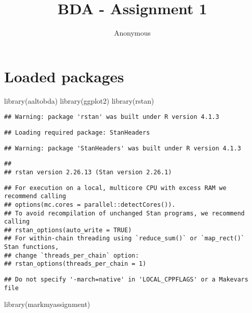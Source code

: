 \documentclass[
]{article}
\title{BDA - Assignment 1}
\author{Anonymous}
\date{}
\newenvironment{Shaded}{\begin{snugshade}}{\end{snugshade}}
\newcommand{\FunctionTok}[1]{\textcolor[rgb]{0.00,0.00,0.00}{#1}}
\newcommand{\NormalTok}[1]{#1}
\begin{document}
\maketitle

{
\hypersetup{linkcolor=}
\setcounter{tocdepth}{1}
\tableofcontents
}
\hypertarget{loaded-packages}{%
\section{Loaded packages}\label{loaded-packages}}

\begin{Shaded}
\begin{Highlighting}[]
\FunctionTok{library}\NormalTok{(aaltobda)}
\FunctionTok{library}\NormalTok{(ggplot2)}
\FunctionTok{library}\NormalTok{(rstan)}
\end{Highlighting}
\end{Shaded}

\begin{verbatim}
## Warning: package 'rstan' was built under R version 4.1.3
\end{verbatim}

\begin{verbatim}
## Loading required package: StanHeaders
\end{verbatim}

\begin{verbatim}
## Warning: package 'StanHeaders' was built under R version 4.1.3
\end{verbatim}

\begin{verbatim}
## 
## rstan version 2.26.13 (Stan version 2.26.1)
\end{verbatim}

\begin{verbatim}
## For execution on a local, multicore CPU with excess RAM we recommend calling
## options(mc.cores = parallel::detectCores()).
## To avoid recompilation of unchanged Stan programs, we recommend calling
## rstan_options(auto_write = TRUE)
## For within-chain threading using `reduce_sum()` or `map_rect()` Stan functions,
## change `threads_per_chain` option:
## rstan_options(threads_per_chain = 1)
\end{verbatim}

\begin{verbatim}
## Do not specify '-march=native' in 'LOCAL_CPPFLAGS' or a Makevars file
\end{verbatim}

\begin{Shaded}
\begin{Highlighting}[]
\FunctionTok{library}\NormalTok{(markmyassignment)}
\end{Highlighting}
\end{Shaded}
\end{document}
